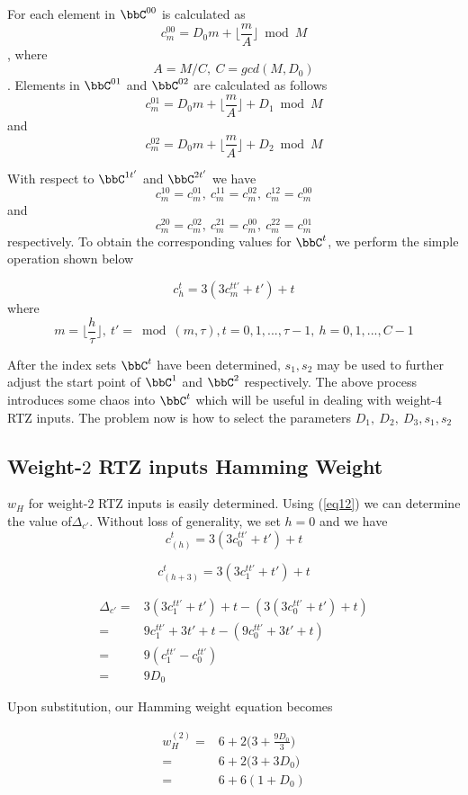  For each element in $\bbC^{00}$ is calculated as $$c_m^{00}=D_0m+\lfloor \frac{m}{A} \rfloor \bmod M $$, where $$A=M/C,~C=gcd(M,D_0)$$.
 Elements in  $\bbC^{01}$ and $\bbC^{02}$ are calculated as follows
 $$c_m^{01}=D_0m+\lfloor \frac{m}{A} \rfloor+D_1 \bmod M $$
 and
 $$c_m^{02}=D_0m+\lfloor \frac{m}{A} \rfloor +D_2\bmod M $$
 
 With respect to $\bbC^{1t'}$ and $\bbC^{2t'}$ we have 
$$ c_m^{10}=c_m^{01},~c_m^{11}=c_m^{02},~c_m^{12}=c_m^{00}$$ and
$$ c_m^{20}=c_m^{02},~c_m^{21}=c_m^{00},~c_m^{22}=c_m^{01}$$
respectively.
To obtain the corresponding values for $\bbC^t$, we perform the simple operation shown below
 
 \begin{equation} 
 c^{t}_h=3(3c^{tt'}_{m}+t')+t
 \label{eq12}
 \end{equation} 
 where $$ m=\Big \lfloor \frac{h}{\tau} \Big \rfloor, ~t'=\bmod(m,\tau),t=0,1,...,\tau-1,~h=0,1,...,C-1$$
 
 After the index sets $\bbC^t$ have been determined, $s_1,s_2$ may be used to further adjust the start point of $\bbC^1$ and $\bbC^2$ respectively.
 The above process introduces some chaos into $\bbC^t$ which will be useful in dealing with weight-$4$ RTZ inputs. The problem now is how to select the parameters $D_1,~D_2,~D_3,s_1,s_2$
 
 \subsection{Weight-$2$ RTZ inputs Hamming Weight}
 $w_H$ for weight-$2$ RTZ inputs is easily determined. 
 Using  (\ref{eq12}) we can determine the  value of$\Delta_{c'}$. Without loss of generality, we set $h=0$ and we have  
 $$c_{(h)}^{t}=3(3c^{tt'}_{0}+t')+t$$
 
 $$c_{(h+3)}^{t}=3(3c^{tt'}_{1}+t')+t$$
 
 \begin{equation}
 \begin{split}
 \Delta_{c'}=& 3(3c^{tt'}_{1}+t')+t-(3(3c^{tt'}_{0}+t')+t)\\
 =&9c^{tt'}_{1}+3t'+t-(9c^{tt'}_{0}+3t'+t)\\
 =&9(c^{tt'}_{1}-c^{tt'}_{0})\\
 =&9D_0
 \end{split}
 \end{equation}
 
 Upon substitution, our Hamming weight equation becomes
 
 \begin{equation}
 \begin{split}
w_H^{(2)}=&6+2\Big(3+\frac{9D_0}{3}\Big)\\
=&6+2\Big(3+3D_0\Big)\\
=&6+6(1+D_0)
\end{split}
\end{equation}

